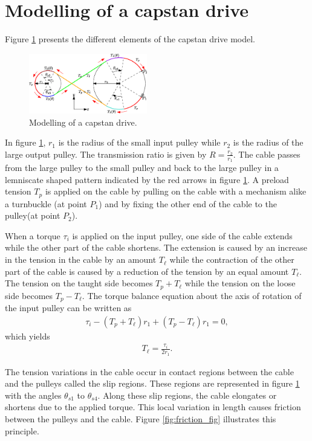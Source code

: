 \section{Modelling of a capstan drive}
Figure \ref{fig:model_capstan} presents the different elements of the capstan drive model.
\begin{figure}
    \centering
    \includegraphics[width=0.46\textwidth]{modelling_of_capstan_drive.eps}
    \caption{Modelling of a capstan drive.}
    \label{fig:model_capstan}
\end{figure}
In figure \ref{fig:model_capstan}, $r_1$ is the radius of the small input pulley while $r_2$ is the radius of the large output pulley. The transmission ratio is given by $R = \frac{r_2}{r_1}$. The cable passes from the large pulley to the small pulley and back to the large pulley in a lemniscate shaped pattern indicated by the red arrows in figure \ref{fig:model_capstan}. A preload tension $T_p$ is applied on the cable by pulling on the cable with a mechanism alike a turnbuckle (at point $P_1$) and by fixing the other end of the cable to the pulley(at point $P_2$).\par
When a torque $\tau_i$ is applied on the input pulley, one side of the cable extends while the other part of the cable shortens. The extension is caused by an increase in the tension in the cable by an amount $T_\ell$ while the contraction of the other part of the cable is caused by a reduction of the tension by an equal amount $T_\ell$. The tension on the taught side becomes $T_p+T_\ell$ while the tension on the loose side becomes $T_p-T_\ell$. The torque balance equation about the axis of rotation of the input pulley can be written as
\begin{align}
    \tau_i - (T_p+T_\ell)r_1 + (T_p-T_\ell)r_1 = 0, \label{eq:first_equation_p0}
\end{align}
which yields
\begin{align}
T_\ell = \frac{\tau_i}{2r_1}.
\label{eq:first_equation}
\end{align}
\par
The tension variations in the cable occur in contact regions between the cable and the pulleys called the slip regions. These regions are represented in figure \ref{fig:model_capstan} with the angles $\theta_{s1}$ to $\theta_{s4}$. Along these slip regions, the cable elongates or shortens due to the applied torque. This local variation in length causes friction between the pulleys and the cable. Figure \ref{fig:friction_fig} illustrates this principle. 
